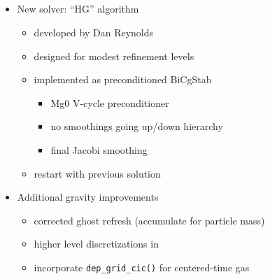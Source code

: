 \NEWSEC


\subsection{\ssRecentScalableGravity}

\begin{frame}[fragile,label=ss-recent-scalable-gravity] 
\secframetitle{\ssRecentScalableGravity}

\begin{itemize}
  \item New solver: ``HG'' algorithm
  \begin{itemize}
    \item developed by Dan Reynolds
    \item designed for modest refinement levels
    \item implemented as preconditioned BiCgStab
    \begin{itemize}
      \item Mg0 V-cycle preconditioner
      \item no smoothings going up/down hierarchy
      \item final Jacobi smoothing
    \end{itemize}
    \item restart with previous solution
  \end{itemize}
  \item Additional gravity improvements
  \begin{itemize}
    \item corrected ghost refresh (accumulate for particle mass)
    \item higher level discretizations in 
    \item incorporate \verb+dep_grid_cic()+ for centered-time gas
  \end{itemize}
\end{itemize}
\end{frame}

